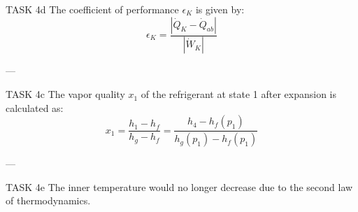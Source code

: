 TASK 4d  
The coefficient of performance \( \epsilon_K \) is given by:  
\[
\epsilon_K = \frac{\left| \dot{Q}_K - \dot{Q}_{ab} \right|}{\left| \dot{W}_K \right|}
\]

---

TASK 4c  
The vapor quality \( x_1 \) of the refrigerant at state 1 after expansion is calculated as:  
\[
x_1 = \frac{h_1 - h_f}{h_g - h_f} = \frac{h_4 - h_f(p_1)}{h_g(p_1) - h_f(p_1)}
\]

---

TASK 4e  
The inner temperature would no longer decrease due to the second law of thermodynamics.